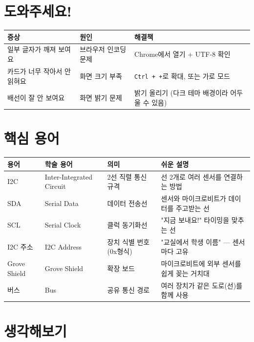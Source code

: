 \documentclass[11pt,a4paper]{article}
\begin{document}
\section*{ 도와주세요!}

\begin{center}
\renewcommand{\arraystretch}{1.4}
\begin{tabular}{|p{4.4cm}|p{3.2cm}|p{7.4cm}|}
\hline
\rowcolor{tableheader}
\textbf{증상} & \textbf{원인} & \textbf{해결책} \\
\hline
일부 글자가 깨져 보여요 & 브라우저 인코딩 문제 & Chrome에서 열기 + UTF-8 확인 \\
\hline
카드가 너무 작아서 안 읽혀요 & 화면 크기 부족 & \texttt{Ctrl + +}로 확대, 또는 가로 모드 \\
\hline
배선이 잘 안 보여요 & 화면 밝기 문제 & 밝기 올리기 (다크 테마 배경이라 어두울 수 있음) \\
\hline
\end{tabular}
\end{center}


\section*{ 핵심 용어}

\begin{center}
\renewcommand{\arraystretch}{1.4}
\begin{tabular}{|p{1.8cm}|p{3.5cm}|p{3.4cm}|p{6.3cm}|}
\hline
\rowcolor{tableheader}
\textbf{용어} & \textbf{학술 용어} & \textbf{의미} & \textbf{쉬운 설명} \\
\hline
I2C & Inter-Integrated Circuit & 2선 직렬 통신 규격 & 선 2개로 여러 센서를 연결하는 방법 \\
\hline
SDA & Serial Data & 데이터 전송선 & 센서와 마이크로비트가 데이터를 주고받는 선 \\
\hline
SCL & Serial Clock & 클럭 동기화선 & "지금 보내요!" 타이밍을 맞추는 선 \\
\hline
I2C 주소 & I2C Address & 장치 식별 번호 (0x형식) & "교실에서 학생 이름" — 센서마다 고유 \\
\hline
Grove Shield & Grove Shield & 확장 보드 & 마이크로비트에 외부 센서를 쉽게 꽂는 거치대 \\
\hline
버스 & Bus & 공유 통신 경로 & 여러 장치가 같은 도로(선)를 함께 사용 \\
\hline
\end{tabular}
\end{center}


\section*{ 생각해보기}
\end{document}
